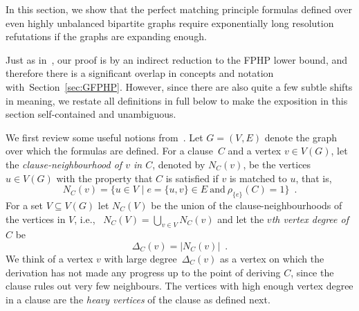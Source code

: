 \documentclass{article}
\newcommand{\set}[1]{\{ #1 \}}
\newcommand{\setdescr}[3][\mid]{\set{ #2 #1 #3 }}
\newcommand{\setsize}[1]{\lvert#1\rvert}
\newcommand{\introduceterm}[1]{{\emph{#1}}}
\newcommand{\eqperiod}{\enspace .}
\newcommand{\ie}{i.e.,\ }
\newcommand{\refsec}[1]{Section~\ref{#1}}
\newcommand{\heavy}{heavy\xspace}
\newcommand{\neigh}[2][]{N_{{#1}}(#2)}
\renewcommand{\deg}[2][XXXXXXXXXXXX]{\Delta_{#1}(#2)}
\newcommand{\V}[1][]{V_{#1}}
\newcommand{\matchboolof}[2]{\rho_{#1}(#2)}
\numberwithin{equation}{section}
\begin{document}
In this section, we show that the perfect matching principle formulas
defined over even highly unbalanced bipartite graphs 
require exponentially long resolution refutations if the graphs are
expanding enough.  


Just as in~\cite{Razborov04ResolutionLowerBoundsPM}, our proof is by an
indirect reduction to the  FPHP lower bound, and therefore there is a
significant overlap in concepts and notation with~\refsec{sec:GFPHP}.
However, since there are also quite a few subtle shifts in meaning, 
we restate all definitions in full below to make the exposition in
this section self-contained and unambiguous.

We first review some useful notions
from~\cite{Razborov01ImprovedResolutionLowerBoundsWPHP}. 
Let
$G = (\V, E)$
denote the graph over which the formulas are defined.
For a 
clause~$C$ and a 
vertex $v \in V(G)$,
let the \introduceterm{clause-neighbourhood of $v$ in $C$}, denoted by $\neigh[C]{v}$,  be
the vertices $u \in V(G)$ with the property that $C$ is satisfied if
$v$ is matched to $u$, that is,
\begin{equation}
	\neigh[C]{v} = \setdescr{ u \in \V }{ e=\set{u, v} \in 
	E~\text{and}~\matchboolof{\set{e}}{C} = 1 } 
   \eqperiod
\end{equation}
For a set $V \subseteq V(G)$ let $\neigh[C]{V}$ be the union of the
clause-neighbourhoods of the vertices in $V$, \ie
$
  \neigh[C]{V} = \bigcup_{v \in V}\neigh[C]{v}
$ and let the \introduceterm{$v$th vertex degree of $C$} be
\begin{equation}
  \deg[C]{v} = \setsize{ \neigh[C]{v} } 
\eqperiod
\end{equation}
We think of a vertex $v$ with large 
degree~$\deg[C]{v}$ 
as a vertex on which the derivation has
not made any progress up to the point of deriving $C$, since the
clause rules out very few
neighbours.
The vertices with high enough vertex degree in a clause are the 
\emph{\heavy vertices} of the clause as defined next.
\end{document}

